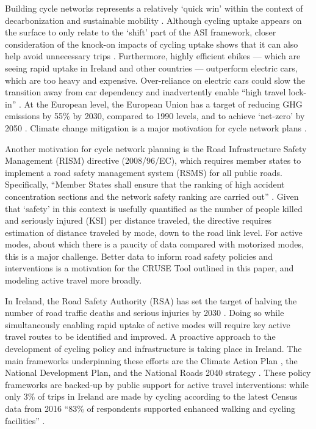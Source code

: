 \documentclass[
  super,
  preprint,
  3p]{elsarticle}
\begin{document}
Building cycle networks represents a relatively `quick win' within the
context of decarbonization \citep{brand2020} and sustainable mobility
\citep{burns2013}. Although cycling uptake appears on the surface to
only relate to the `shift' part of the ASI framework, closer
consideration of the knock-on impacts of cycling uptake shows that it
can also help avoid unnecessary trips \citep{nello-deakin2020}.
Furthermore, highly efficient ebikes --- which are seeing rapid uptake
in Ireland and other countries --- outperform electric cars, which are
too heavy and expensive. Over-reliance on electric cars could slow the
transition away from car dependency and inadvertently enable ``high
travel lock-in'' \citep{anable2019}. At the European level, the European
Union has a target of reducing GHG emissions by 55\% by 2030, compared
to 1990 levels, and to achieve `net-zero' by 2050 \citep{rosenow2022}.
Climate change mitigation is a major motivation for cycle network plans
\citep{scappini2022}.

Another motivation for cycle network planning is the Road Infrastructure
Safety Management (RISM) directive (2008/96/EC), which requires member
states to implement a road safety management system (RSMS) for all
public roads. Specifically, ``Member States shall ensure that the
ranking of high accident concentration sections and the network safety
ranking are carried out'' \citep{directiv2008}. Given that `safety' in
this context is usefully quantified as the number of people killed and
seriously injured (KSI) per distance traveled, the directive requires
estimation of distance traveled by mode, down to the road link level.
For active modes, about which there is a paucity of data compared with
motorized modes, this is a major challenge. Better data to inform road
safety policies and interventions is a motivation for the CRUSE Tool
outlined in this paper, and modeling active travel more broadly.

In Ireland, the Road Safety Authority (RSA) has set the target of
halving the number of road traffic deaths and serious injuries by 2030
\citep{national2021}. Doing so while simultaneously enabling rapid
uptake of active modes will require key active travel routes to be
identified and improved. A proactive approach to the development of
cycling policy and infrastructure is taking place in Ireland. The main
frameworks underpinning these efforts are the Climate Action Plan
\citep{climate2022a}, the National Development Plan, and the National
Roads 2040 strategy \citep{national2023}. These policy frameworks are
backed-up by public support for active travel interventions: while only
3\% of trips in Ireland are made by cycling according to the latest
Census data from 2016 ``83\% of respondents supported enhanced walking
and cycling facilities'' \citep{sustaina2019}.
\end{document}

